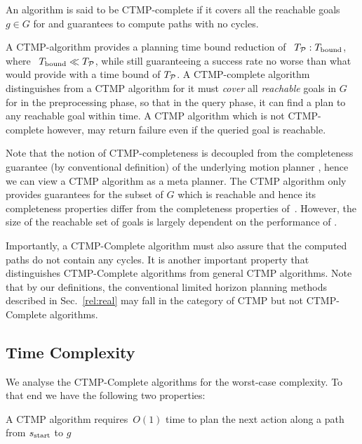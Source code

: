 \documentclass[a4paper]{report}
\begin{document}
\vspace{2mm}
\begin{definition}
\label{def:complete}
    An algorithm  is said to be CTMP-complete if it covers all the reachable goals $g \in G$ for \Sstart and guarantees to compute paths with no cycles.
\end{definition}

A CTMP-algorithm provides a planning time bound reduction of ~$T_\mathcal{P} : T_{\textrm{bound}}$, where ~$T_{\textrm{bound}} \ll T_\textrm{\ensuremath{\mathcal{P}}}$, while still guaranteeing a success rate no worse than what \calP would provide with a time bound of $T_\mathcal{P}$.
%
A CTMP-complete algorithm distinguishes from a CTMP algorithm for it must \emph{cover} all \emph{reachable} goals in $G$ for \Sstart in the preprocessing phase, so that in the query phase, it can find a plan to any reachable goal within \Tbound time. A CTMP algorithm which is not CTMP-complete however, may return failure even if the queried goal is reachable.
%

Note that the notion of CTMP-completeness is decoupled from the completeness guarantee (by conventional definition) of the underlying motion planner \calP, hence we can view a CTMP algorithm as a meta planner. The CTMP algorithm only provides guarantees for the subset of $G$ which is reachable and hence its completeness properties differ from the completeness properties of~\calP. However, the size of the reachable set of goals is largely dependent on the performance of \calP.

Importantly, a CTMP-Complete algorithm must also assure that the computed paths do not contain any cycles. It is another important property that distinguishes CTMP-Complete algorithms from general CTMP algorithms. Note that by our definitions, the conventional limited horizon planning methods described in Sec.~\ref{rel:real} may fall in the category of CTMP but not CTMP-Complete algorithms. 

\subsection{Time Complexity}
We analyse the CTMP-Complete algorithms for the worst-case complexity. To that end we have the following two properties:

\vspace{2mm}
\begin{property}
\label{ctmp:prop1}
A CTMP algorithm requires~$O(1)$ time to plan the next action along a path from $s_{\text{start}}$ to $g$
\end{property}
\end{document}
